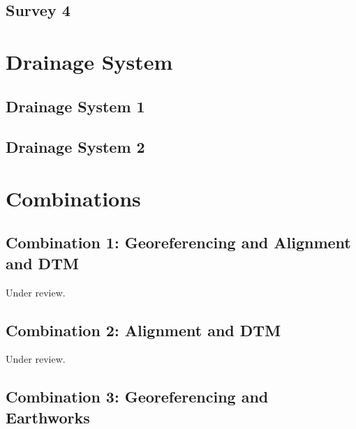 \documentclass{scrartcl}
\begin{document}
\subsection{Survey 4} %
\label{sec:survey_4}
\clearpage


\section{Drainage System}
\label{sec:drainage_system}

\subsection{Drainage System 1}
\label{sec:drainage_1}
\clearpage

\subsection{Drainage System 2}
\label{sec:drainage_2}
\clearpage

\section{Combinations}
\label{sec:combinations}

\subsection{Combination 1: Georeferencing and Alignment and DTM} %
\label{sec:align_dtm_1}
Under review.%
\clearpage

\subsection{Combination 2: Alignment and DTM} %
\label{sec:align_dtm_2}
Under review.%
\clearpage

\subsection{Combination 3: Georeferencing and Earthworks}
\label{sec:georef_earth_1}
\clearpage
\end{document}
